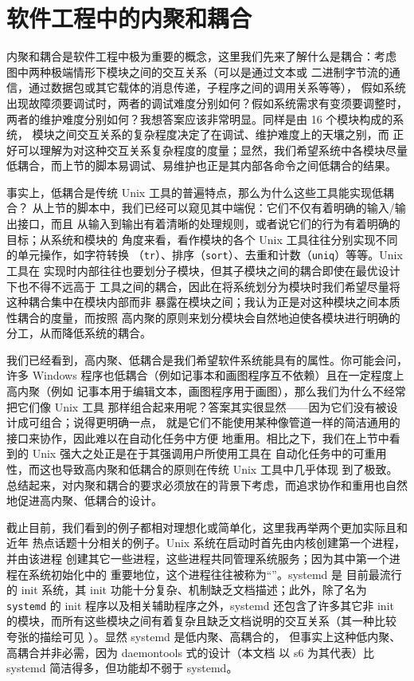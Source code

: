 \section{软件工程中的内聚和耦合}\label{sec:coupling}

内聚和耦合是软件工程中极为重要的概念，这里我们先来了解什么是耦合：考虑
\parencite{litt2014a} 图中两种极端情形下模块之间的交互关系（可以是通过文本或
二进制字节流的通信，通过数据包或其它载体的消息传递，子程序之间的调用关系等等），
假如系统出现故障须要调试时，两者的调试难度分别如何？假如系统需求有变须要调整时，
两者的维护难度分别如何？我想答案应该非常明显。同样是由 16 个模块构成的系统，
模块之间交互关系的复杂程度决定了在调试、维护难度上的天壤之别，而
正好可以理解为对这种交互关系复杂程度的度量；显然，我们希望系统中各模块尽量
低耦合，而上节的脚本易调试、易维护也正是其内部各命令之间低耦合的结果。

事实上，低耦合是传统 Unix 工具的普遍特点，那么为什么这些工具能实现低耦合？
从上节的脚本中，我们已经可以窥见其中端倪：它们不仅有着明确的输入/输出接口，而且
从输入到输出有着清晰的处理规则，或者说它们的行为有着明确的目标；从系统和模块的
角度来看，看作模块的各个 Unix 工具往往分别实现不同的单元操作，如字符转换
（\verb|tr|）、排序（\verb|sort|）、去重和计数（\verb|uniq|）等等。Unix 工具在
实现时内部往往也要划分子模块，但其子模块之间的耦合即使在最优设计下也不得不远高于
工具之间的耦合，因此在将系统划分为模块时我们希望尽量将这种耦合集中在模块内部而非
暴露在模块之间；我认为正是对这种模块之间本质性耦合的度量，而按照
高内聚的原则来划分模块会自然地迫使各模块进行明确的分工，从而降低系统的耦合。

我们已经看到，高内聚、低耦合是我们希望软件系统能具有的属性。你可能会问，许多
Windows 程序也低耦合（例如记事本和画图程序互不依赖）且在一定程度上高内聚（例如
记事本用于编辑文本，画图程序用于画图），那么我们为什么不经常把它们像 Unix 工具
那样组合起来用呢？答案其实很显然——因为它们没有被设计成可组合；说得更明确一点，
就是它们不能使用某种像管道一样的简洁通用的接口来协作，因此难以在自动化任务中方便
地重用。相比之下，我们在上节中看到的 Unix 强大之处正是在于其强调用户所使用工具在
自动化任务中的可重用性，而这也导致高内聚和低耦合的原则在传统 Unix 工具中几乎体现
到了极致。总结起来，对内聚和耦合的要求必须放在的背景下考虑，而追求协作和重用也自然地促进高内聚、低耦合的设计。

截止目前，我们看到的例子都相对理想化或简单化，这里我再举两个更加实际且和近年
热点话题十分相关的例子。Unix 系统在启动时首先由内核创建第一个进程，并由该进程
创建其它一些进程，这些进程共同管理系统服务；因为其中第一个进程在系统初始化中的
重要地位，这个进程往往被称为“”。systemd 是
目前最流行的 init 系统，其 init 功能十分复杂、机制缺乏文档描述；此外，除了名为
\verb|systemd| 的 init 程序以及相关辅助程序之外，systemd 还包含了许多其它非
init 的模块，而所有这些模块之间有着复杂且缺乏文档说明的交互关系（其一种比较
夸张的描绘可见 \parencite{litt2014b}）。显然 systemd 是低内聚、高耦合的，
但事实上这种低内聚、高耦合并非必需，因为 daemontools 式的设计（本文档
以 s6 为其代表）比 systemd 简洁得多，但功能却不弱于 systemd。

